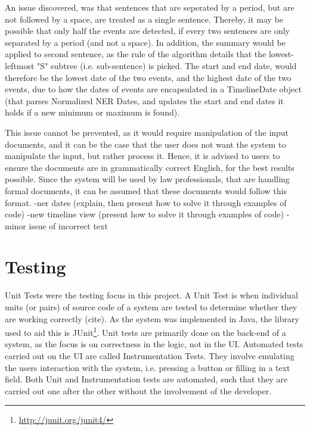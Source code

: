 \par An issue discovered, was that sentences that are seperated by a period, but are not followed by a space, are treated as a single sentence. Thereby, it may be possible that only half the events are detected, if every two sentences are only separated by a period (and not a space). In addition, the summary would be applied to second sentence, as the rule of the algorithm details that the lowest-leftmost "S" subtree (i.e. sub-sentence) is picked. The start and end date, would therefore be the lowest date of the two events, and the highest date of the two events, due to how the dates of events are encapsulated in a TimelineDate object (that parses Normalized NER Dates, and updates the start and end dates it holds if a new minimum or maximum is found).

\par This issue cannot be prevented, as it would require manipulation of the input documents, and it can be the case that the user does not want the system to manipulate the input, but rather process it. Hence, it is advised to users to ensure the documents are in grammatically correct English, for the best results possible. Since the system will be used by law professionals, that are handling formal documents, it can be assumed that these documents would follow this format.
-ner dates (explain, then present how to solve it through examples of code)
-new timeline view (present how to solve it through examples of code)
-minor issue of incorrect text

\section{Testing}
\par Unit Tests were the testing focus in this project. A Unit Test is when individual units (or pairs) of source code of a system are tested to determine whether they are working correctly (cite). As the system was implemented in Java, the library used to aid this is JUnit\footnote{\url{http://junit.org/junit4/}}. Unit tests are primarily done on the back-end of a system, as the focus is on correctness in the logic, not in the UI. Automated tests carried out on the UI are called Instrumentation Tests. They involve emulating the users interaction with the system, i.e. pressing a button or filling in a text field. Both Unit and Instrumentation tests are automated, such that they are carried out one after the other without the involvement of the developer.

